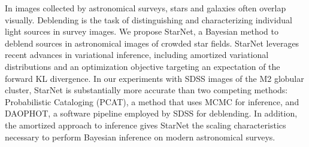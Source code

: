 In images collected by astronomical surveys, stars and galaxies often overlap visually. Deblending is the task of distinguishing and characterizing individual light sources in survey images. We propose StarNet, a Bayesian method to deblend sources in astronomical images of crowded star fields. StarNet leverages recent advances in variational inference, including amortized variational distributions and an optimization objective targeting an expectation of the forward KL divergence. In our experiments with SDSS images of the M2 globular cluster, StarNet is substantially more accurate than two competing methods: Probabilistic Cataloging (PCAT), a method that uses MCMC for inference, and DAOPHOT, a software pipeline employed by SDSS for deblending. In addition, the amortized approach to inference gives StarNet the scaling characteristics necessary to perform Bayesian inference on modern astronomical surveys.
